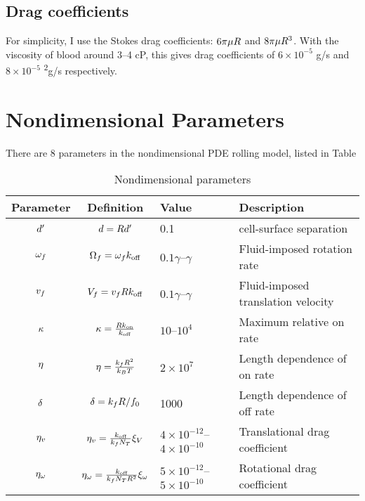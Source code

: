 \documentclass{article}
\begin{document}
\subsection{Drag coefficients}
\label{sec:drag-coefficients}

For simplicity, I use the Stokes drag coefficients:
$6\pi\mu R$ and $8\pi\mu R^3$. With the
viscosity of blood around 3–4 cP, this gives drag coefficients of $6
\times 10^{-5}$ g/s and $8 \times 10^{-5}$
\textmugreek\textsuperscript{2}g/s respectively.

\section{Nondimensional Parameters}
\label{sec:nd-params}

There are 8 parameters in the nondimensional PDE rolling model, listed
in Table

\begin{table}
  \centering
  \begin{tabular}{c|c|l|l}
    Parameter & Definition & Value & Description \\ \hline
    $d'$ & $d = Rd'$ & 0.1
                                   & cell-surface separation \\
    $\omega_f$ & $\Omega_f = \omega_fk_\text{off}$
                           & $0.1\gamma$--$\gamma$ & Fluid-imposed
                                                     rotation rate \\
    $v_f$ & $V_f = v_fRk_\text{off}$
                           & $0.1\gamma$--$\gamma$
                                   & Fluid-imposed translation
                                     velocity \\
    $\kappa$ & $\kappa = \frac{Rk_\text{on}}{k_\text{off}}$
                           & $10$--$10^4$ & Maximum relative on rate \\
    $\eta$ & $\eta =
                    \frac{k_fR^2}{k_BT}$
                           & $2 \times 10^7$ & Length dependence of on
                                               rate \\
    $\delta$ & $\delta = k_fR/f_0$
                           & 1000 & Length dependence of off rate \\
    $\eta_v$ & $\eta_v =
                     \frac{k_\text{off}}{k_fN_T}
                     \xi_V$ & $4 \times 10^{-12}$--$4 \times
                                     10^{-10}$
                                   & Translational drag coefficient \\
    $\eta_\omega$ & $\eta_\omega =
                     \frac{k_\text{off}}{k_fN_T
                                      R^2}\xi_\omega$
                           & $5 \times 10^{-12}$--$5 \times 10^{-10}$
                                   & Rotational drag coefficient
  \end{tabular}
  \caption{Nondimensional parameters}
  \label{tab:nd-params}
\end{table}


\end{document}
